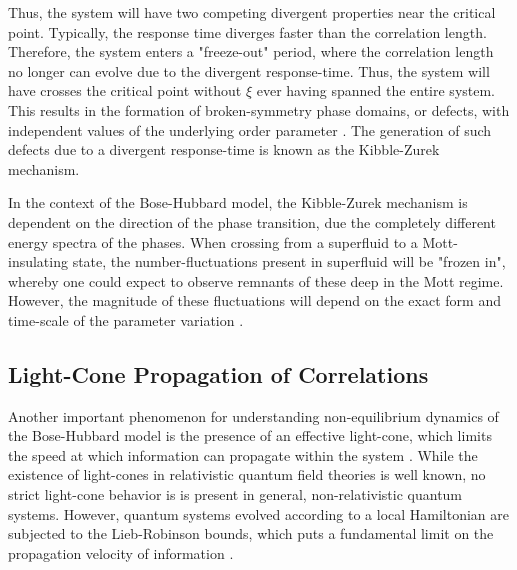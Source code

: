Thus, the system will have two competing divergent properties near the critical point. Typically, the response time diverges faster than the correlation length. Therefore, the system enters a "freeze-out" period, where the correlation length no longer can evolve due to the divergent response-time.
Thus, the system will have crosses the critical point without $\xi$ ever having spanned the entire system. This results in the formation of broken-symmetry phase domains, or defects, with independent values of the underlying order parameter \cite{Gillman2018}. The generation of such defects due to a divergent response-time is known as the Kibble-Zurek mechanism.

In the context of the Bose-Hubbard model, the Kibble-Zurek mechanism is dependent on the direction of the phase transition, due the completely different energy spectra of the phases. When crossing from a superfluid to a Mott-insulating state, the number-fluctuations present in superfluid will be "frozen in", whereby one could expect to observe remnants of these deep in the Mott regime. However, the magnitude of these fluctuations will depend on the exact form and time-scale of the parameter variation \cite{Schutzhold2006}.


\subsection{Light-Cone Propagation of Correlations}
Another important phenomenon for understanding non-equilibrium dynamics of the Bose-Hubbard model is the presence of an effective light-cone, which limits the speed at which information can propagate within the system \cite{Eisert2015}. 
While the existence of light-cones in relativistic quantum field theories is well known, no strict light-cone behavior is is present in general, non-relativistic quantum systems. However, quantum systems evolved according to a local Hamiltonian are subjected to the Lieb-Robinson bounds, which puts a fundamental limit on the propagation velocity of information \cite{Lieb1972}.\\


